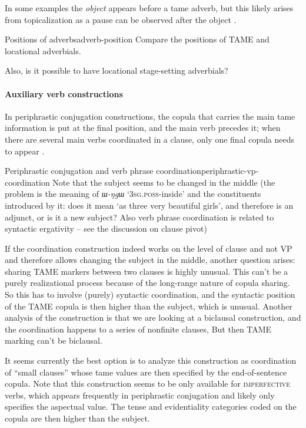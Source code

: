 \documentclass[a4paper, oneside, 12pt]{report}
\newcommand*{\citepage}[1]{p.~{#1}}
\newcommand*{\citepages}[1]{pp.~{#1}}
\newcommand{\form}[1]{\emph{#1}}
\newcommand{\category}[1]{\textsc{#1}}
\newcommand{\translate}[1]{`#1'}
\begin{document}
In some examples the \emph{object} appears before a \ac{tame} adverb,
but this likely arises from topicalization as a pause can be observed after the object
\citep[\citepage{1210}, (82)]{jacques2021grammar}.

\begin{todobox}{Positions of adverbs}{adverb-position}
    Compare the positions of TAME and locational adverbials.
    
    Also, is it possible to have locational stage-setting adverbials?
\end{todobox}

\paragraph*{Auxiliary verb constructions}
In periphrastic conjugation constructions, 
the copula that carries the main \ac{tame} information 
is put at the final position, 
and the main verb precedes it; 
when there are several main verbs coordinated in a clause, 
only one final copula needs to appear \citep[\citepages{1090-1091}]{jacques2021grammar}.

\begin{todobox}{Periphrastic conjugation and verb phrase coordination}{periphrastic-vp-coordination} 
    Note that the subject seems to be changed in the middle 
    (the problem is the meaning of \form{ɯ-ŋgɯ} \translate{\category{3sg.poss}-inside}
    and the constituents introduced by it: 
    does it mean \translate{as three very beautiful girls}, 
    and therefore is an adjunct, or is it a new subject? 
    Also verb phrase coordination is related to syntactic ergativity -- 
    see the discussion on clause pivot)
    
    If the coordination construction indeed works on the level of clause and not VP
    and therefore allows changing the subject in the middle,
    another question arises:
    sharing TAME markers between two clauses is highly unusual.
    This can't be a purely realizational process
    because of the long-range nature of copula sharing.
    So this has to involve (purely) syntactic coordination,
    and the syntactic position of the TAME copula is then higher than the subject,
    which is unusual.
    Another analysis of the construction is that we are looking at a biclausal construction,
    and the coordination happens to a series of nonfinite clauses,
    But then TAME marking can't be biclausal. 
    
    It seems currently the best option is to analyze this construction as coordination of ``small clauses''
    whose \ac{tame} values are then specified by the end-of-sentence copula.
    Note that this construction seems to be only available for \category{imperfective} verbs,
    which appears frequently in periphrastic conjugation
    and likely only specifies the aspectual value. 
    The tense and evidentiality categories coded on the copula are then higher than the subject.
\end{todobox}
\end{document}
